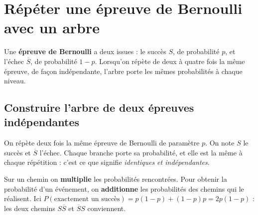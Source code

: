 
\section{Répéter une épreuve de Bernoulli avec un arbre}

Une \textbf{épreuve de Bernoulli} a deux issues : le succès $S$, de probabilité
$p$, et l'échec $\overline S$, de probabilité $1-p$. Lorsqu'on répète de deux
à quatre fois la même épreuve, de façon indépendante, l'arbre porte les mêmes
probabilités à chaque niveau.


\subsection*{Construire l'arbre de deux épreuves indépendantes}

On répète deux fois la même épreuve de Bernoulli de paramètre $p$. On note $S$
le succès et $\overline S$ l'échec. Chaque branche porte sa probabilité, et
elle est la même à chaque répétition : c'est ce que signifie \emph{identiques
et indépendantes}.

\begin{center}
\end{center}

Sur un chemin on \textbf{multiplie} les probabilités rencontrées. Pour obtenir
la probabilité d'un événement, on \textbf{additionne} les probabilités des
chemins qui le réalisent. Ici $P(\text{exactement un succès}) = p(1-p) + (1-p)p
= 2p(1-p)$ : les deux chemins $S\overline S$ et $\overline S S$ conviennent.

